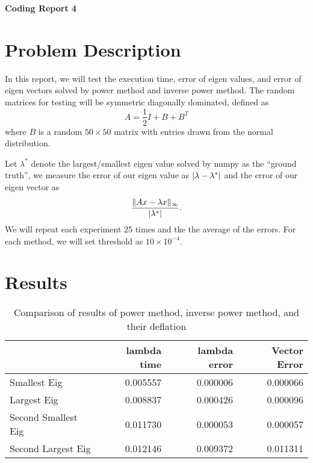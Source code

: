 \documentclass[a4paper,12pt]{article}
\begin{document}
\begin{center} %
	{\Large \bf Coding Report 4} %
	\vspace{2mm}
\end{center}  


\section{Problem Description}

In this report, we will test the execution time, error of eigen values, and error of eigen vectors
solved by power method and inverse power method.
The random matrices for testing will be symmetric diagonally dominated, defined as
$$
A = \frac{1}{2}I + B + B^{T}
$$
where $B$ is a random $50 \times 50$ matrix with entries drawn from the normal distribution.

Let $\lambda^*$ denote the largest/smallest eigen value solved by numpy as the ``ground truth'',
we measure the error of our eigen value as $\lvert\lambda - \lambda^*\rvert$
and the error of our eigen vector as
$$
\frac{\lVert Ax - \lambda x\rVert_{\infty}}{\lvert\lambda^*\rvert}.
$$
We will repeat each experiment 25 times and tke the average of the errors.
For each method, we will set threshold as $10 \times 10^{-4}$.

\section{Results}

\begin{table}[h]
\begin{center}
	\begin{tabular}{lrrr}
	\toprule
	{} &  lambda time &  lambda error &  Vector Error \\
	\midrule
	Smallest Eig        &     0.005557 &      0.000006 &      0.000066 \\
	Largest Eig         &     0.008837 &      0.000426 &      0.000096 \\
	Second Smallest Eig &     0.011730 &      0.000053 &      0.000057 \\
	Second Largest Eig  &     0.012146 &      0.009372 &      0.011311 \\
	\bottomrule
	\end{tabular}
	\caption{Comparison of results of power method, inverse power method, and their deflation}
\end{center}
\end{table}
\end{document}
